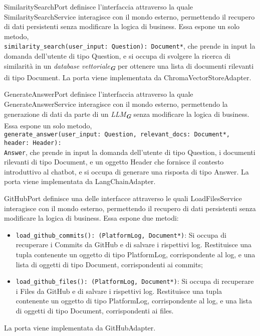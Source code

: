 \label{sec:similarity_search_port}
SimilaritySearchPort definisce l'interfaccia attraverso la quale SimilaritySearchService interagisce con il mondo esterno, permettendo il recupero di dati persistenti senza modificare la logica di business. Essa espone un solo metodo,\\ \texttt{similarity\_search(user\_input: Question): Document*}, che prende in input la domanda dell'utente di tipo Question, e si occupa di svolgere la ricerca di similarità in un \emph{database vettoriale}\textsubscript{\textbf{\textit{G}}} per ottenere una lista di documenti rilevanti di tipo Document. La porta viene implementata da ChromaVectorStoreAdapter.

\label{sec:generate_answer_port}
GenerateAnswerPort definisce l'interfaccia attraverso la quale GenerateAnswerService interagisce con il mondo esterno, permettendo la generazione di dati da parte di un \emph{LLM}\textsubscript{\textbf{\textit{G}}} senza modificare la logica di business. Essa espone un solo metodo,\\ \texttt{generate\_answer(user\_input: Question, relevant\_docs: Document*, header: Header):\\ Answer}, che prende in input la domanda dell'utente di tipo Question, i documenti rilevanti di tipo Document, e un oggetto Header che fornisce il contesto introduttivo al chatbot, e si occupa di generare una risposta di tipo Answer. La porta viene implementata da LangChainAdapter.

\label{sec:github_port}
GitHubPort definisce una delle interfacce attraverso le quali LoadFilesService interagisce con il mondo esterno, permettendo il recupero di dati persistenti senza modificare la logica di business. Essa espone due metodi:
\begin{itemize}
    \item \texttt{load\_github\_commits(): (PlatformLog, Document*)}: Si occupa di recuperare i Commits da GitHub e di salvare i rispettivi log. Restituisce una tupla contenente un oggetto di tipo PlatformLog, corrispondente al log, e una lista di oggetti di tipo Document, corrispondenti ai commits;
    \item \texttt{load\_github\_files(): (PlatformLog, Document*)}: Si occupa di recuperare i Files da GitHub e di salvare i rispettivi log. Restituisce una tupla contenente un oggetto di tipo PlatformLog, corrispondente al log, e una lista di oggetti di tipo Document, corrispondenti ai files.
\end{itemize}
La porta viene implementata da GitHubAdapter.

